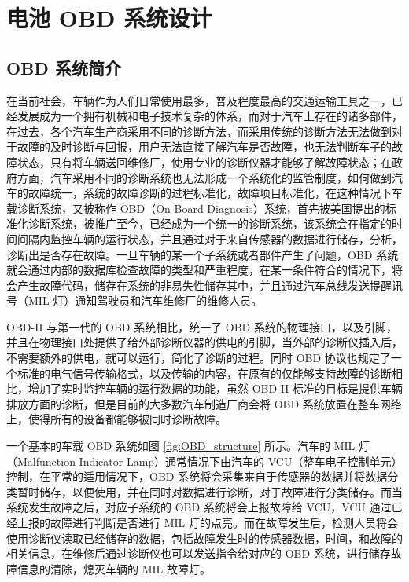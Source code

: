 \chapter{电池 OBD 系统设计}
\label{chap:OBD}

\section{OBD 系统简介}
在当前社会，车辆作为人们日常使用最多，普及程度最高的交通运输工具之一，已经发展成为一个拥有机械和电子技术复杂的体系，而对于汽车上存在的诸多部件，在过去，各个汽车生产商采用不同的诊断方法，而采用传统的诊断方法无法做到对于故障的及时诊断与回报，用户无法直接了解汽车是否故障，也无法判断车子的故障状态，只有将车辆送回维修厂，使用专业的诊断仪器才能够了解故障状态；在政府方面，汽车采用不同的诊断系统也无法形成一个系统化的监管制度，如何做到汽车的故障统一，系统的故障诊断的过程标准化，故障项目标准化，在这种情况下车载诊断系统，又被称作 OBD（On Board Diagnosis）系统，首先被美国提出的标准化诊断系统，被推广至今，已经成为一个统一的诊断系统，该系统会在指定的时间间隔内监控车辆的运行状态，并且通过对于来自传感器的数据进行储存，分析，诊断出是否存在故障。一旦车辆的某一个子系统或者部件产生了问题，OBD 系统就会通过内部的数据库检查故障的类型和严重程度，在某一条件符合的情况下，将会产生故障代码，储存在系统的非易失性储存其中，并且通过汽车总线发送提醒讯号（MIL 灯）通知驾驶员和汽车维修厂的维修人员。

OBD-II 与第一代的 OBD 系统相比，统一了 OBD 系统的物理接口，以及引脚，并且在物理接口处提供了给外部诊断仪器的供电的引脚，当外部的诊断仪插入后，不需要额外的供电，就可以运行，简化了诊断的过程。同时 OBD 协议也规定了一个标准的电气信号传输格式，以及传输的内容，在原有的仅能够支持故障的诊断相比，增加了实时监控车辆的运行数据的功能，虽然 OBD-II 标准的目标是提供车辆排放方面的诊断，但是目前的大多数汽车制造厂商会将 OBD 系统放置在整车网络上，使得所有的设备都能够被同时诊断故障。

一个基本的车载 OBD 系统如图 \ref{fig:OBD_structure} 所示。汽车的 MIL 灯（Malfunction Indicator Lamp）通常情况下由汽车的 VCU（整车电子控制单元）控制，在平常的适用情况下，OBD 系统将会采集来自于传感器的数据并将数据分类暂时储存，以便使用，并在同时对数据进行诊断，对于故障进行分类储存。而当系统发生故障之后，对应子系统的 OBD 系统将会上报故障给 VCU，VCU 通过已经上报的故障进行判断是否进行 MIL 灯的点亮。而在故障发生后，检测人员将会使用诊断仪读取已经储存的数据，包括故障发生时的传感器数据，时间，和故障的相关信息，在维修后通过诊断仪也可以发送指令给对应的 OBD 系统，进行储存故障信息的清除，熄灭车辆的 MIL 故障灯。

